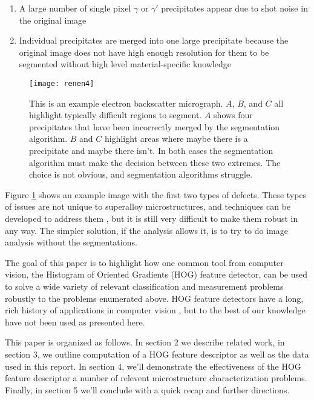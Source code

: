 \documentclass[review]{elsarticle}
\begin{document}
	\begin{enumerate}
		\item \label{prob1} A large number of single pixel $\gamma$ or $\gamma'$ precipitates appear due to shot noise in the original image
		\item Individual precipitates are merged into one large precipitate because the original image does not have high enough resolution for them to be segmented without high level material-specific knowledge
	\end{enumerate}
	
	\begin{figure}[!ht]
  		\centering
    	\texttt{[image: renen4]}
  		\caption{This is an example electron backscatter micrograph. $A$, $B$, and $C$ all highlight typically difficult regions to segment. $A$ shows four precipitates that have been incorrectly merged by the segmentation algorithm. $B$ and $C$ highlight areas where maybe there is a precipitate and maybe there isn't. In both cases the segmentation algorithm must make the decision between these two extremes. The choice is not obvious, and segmentation algorithms struggle. }
  		\label{figure1}
	\end{figure}

	Figure \ref{figure1} shows an example image with the first two types of defects. These types of issues are not unique to superalloy microstructures, and techniques can be developed to address them \cite{comer, marc1, marc2, marc3}, but it is still very difficult to make them robust in any way. The simpler solution, if the analysis allows it, is to try to do image analysis without the segmentations.
	

	The goal of this paper is to highlight how one common tool from computer vision, the Histogram of Oriented Gradients (HOG) feature detector, can be used to solve a wide variety of relevant classification and measurement problems robustly to the problems enumerated above. HOG feature detectors have a long, rich history of applications in computer vision \cite{gradtex, hog, girsh}, but to the best of our knowledge have not been used as presented here.

	This paper is organized as follows. In section 2 we describe related work, in section 3, we outline computation of a HOG feature descriptor as well as the data used in this report. In section 4, we'll demonstrate the effectiveness of the HOG feature descriptor a number of relevent microstructure characterization problems. Finally, in section 5 we'll conclude with a quick recap and further directions.
	
\end{document}
